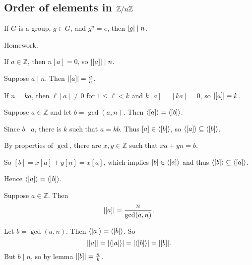 \documentclass[12pt,letterpaper]{report}
\begin{document}
\pagebreak
\subsection[Order of elements in Z/nZ]{Order of elements in $\mathbb{Z}/{n}\mathbb{Z}$}

\begin{lem}{}{}
  If $G$ is a group, $g \in G$, and $g^n = e$, then $\lvert g\rvert \mid n$.
\end{lem}

\begin{thmproof}
  Homework.
\end{thmproof}

If $a \in \mathbb{Z}$, then $n[a] = 0$, so $\lvert[a]\rvert \mid n$.

\begin{lem}{}{}
  Suppose $a \mid n$.
  Then $\lvert[a]\rvert = \frac{n}{a}$.
\end{lem}

\begin{thmproof}
  If $n = ka$, then $\ell[a] \neq 0$ for $1 \leq \ell < k$ and $k[a] = [ka] = 0$, so
  $\lvert[a]\rvert = k$.
\end{thmproof}

\begin{lem}{}{}
  Suppose $a \in \mathbb{Z}$ and let $b = \gcd(a, n)$.
  Then $\langle[a]\rangle = \langle[b]\rangle$.
\end{lem}

\begin{thmproof}
  Since $b \mid a$, there is $k$ such that $a = kb$.
  Thus $[a] \in \langle[b]\rangle$, so $\langle[a]\rangle \subseteq \langle[b]\rangle$.

  By properties of $\gcd$, there are $x, y \in \mathbb{Z}$ such that $xa + yn = b$.

  So $[b] = x[a] + y[n] = x[a]$, which implies $[b] \in \langle[a]\rangle$ and thus
  $\langle[b]\rangle \subseteq \langle[a]\rangle$.

  Hence $\langle[a]\rangle = \langle[b]\rangle$.
\end{thmproof}

\begin{prop}{}{}
  Suppose $a \in \mathbb{Z}$.
  Then
  \[ \lvert[a]\rvert = \frac{n}{\gcd(a, n)}. \]
\end{prop}

\begin{thmproof}
  Let $b = \gcd(a, n)$.
  Then $\langle[a]\rangle = \langle[b]\rangle$.
  So
  \[ \lvert[a]\rvert = \lvert\langle[a]\rangle\rvert = \lvert\langle[b]\rangle\rvert = \lvert[b]\rvert. \]
  But $b \mid n$, so by lemma $\lvert[b]\rvert = \frac{n}{b}$.
\end{thmproof}
\end{document}
